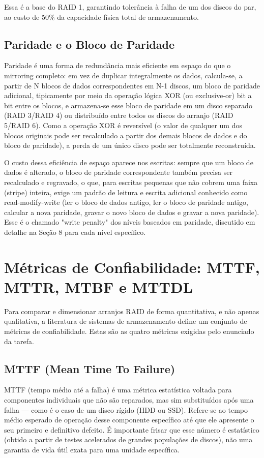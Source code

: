 \documentclass[11pt,a4paper]{article}
\begin{document}
Essa é a base do RAID 1, garantindo tolerância à falha de um dos discos do par, ao custo de 50\% da capacidade física total de armazenamento.

\subsection{Paridade e o Bloco de Paridade}
Paridade é uma forma de redundância mais eficiente em espaço do que o mirroring completo: em vez de duplicar integralmente os dados, calcula-se, a partir de N blocos de dados correspondentes em N-1 discos, um bloco de paridade adicional, tipicamente por meio da operação lógica XOR (ou exclusive-or) bit a bit entre os blocos, e armazena-se esse bloco de paridade em um disco separado (RAID 3/RAID 4) ou distribuído entre todos os discos do arranjo (RAID 5/RAID 6). Como a operação XOR é reversível (o valor de qualquer um dos blocos originais pode ser recalculado a partir dos demais blocos de dados e do bloco de paridade), a perda de um único disco pode ser totalmente reconstruída.

O custo dessa eficiência de espaço aparece nos escritas: sempre que um bloco de dados é alterado, o bloco de paridade correspondente também precisa ser recalculado e regravado, o que, para escritas pequenas que não cobrem uma faixa (stripe) inteira, exige um padrão de leitura e escrita adicional conhecido como read-modify-write (ler o bloco de dados antigo, ler o bloco de paridade antigo, calcular a nova paridade, gravar o novo bloco de dados e gravar a nova paridade). Esse é o chamado "write penalty" dos níveis baseados em paridade, discutido em detalhe na Seção 8 para cada nível específico.

\section{Métricas de Confiabilidade: MTTF, MTTR, MTBF e MTTDL}
Para comparar e dimensionar arranjos RAID de forma quantitativa, e não apenas qualitativa, a literatura de sistemas de armazenamento define um conjunto de métricas de confiabilidade. Estas são as quatro métricas exigidas pelo enunciado da tarefa.

\subsection{MTTF (Mean Time To Failure)}
MTTF (tempo médio até a falha) é uma métrica estatística voltada para componentes individuais que não são reparados, mas sim substituídos após uma falha --- como é o caso de um disco rígido (HDD ou SSD). Refere-se ao tempo médio esperado de operação desse componente específico até que ele apresente o seu primeiro e definitivo defeito. É importante frisar que esse número é estatístico (obtido a partir de testes acelerados de grandes populações de discos), não uma garantia de vida útil exata para uma unidade específica.
\end{document}
